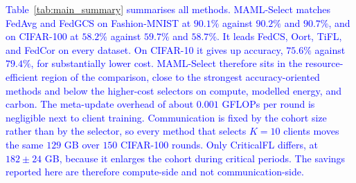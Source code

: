 \documentclass[journal]{IEEEtran}
\newcommand{\revision}[1]{\textcolor{blue}{#1}}
\begin{document}
\revision{Table~\ref{tab:main_summary} summarises all methods. MAML-Select matches FedAvg and FedGCS on Fashion-MNIST at $90.1\%$ against $90.2\%$ and $90.7\%$, and on CIFAR-100 at $58.2\%$ against $59.7\%$ and $58.7\%$. It leads FedCS, Oort, TiFL, and FedCor on every dataset. On CIFAR-10 it gives up accuracy, $75.6\%$ against $79.4\%$, for substantially lower cost. MAML-Select therefore sits in the resource-efficient region of the comparison, close to the strongest accuracy-oriented methods and below the higher-cost selectors on compute, modelled energy, and carbon. The meta-update overhead of about $0.001$ GFLOPs per round is negligible next to client training. Communication is fixed by the cohort size rather than by the selector, so every method that selects $K=10$ clients moves the same $129$ GB over $150$ CIFAR-100 rounds. Only CriticalFL differs, at $182 \pm 24$ GB, because it enlarges the cohort during critical periods. The savings reported here are therefore compute-side and not communication-side.}
\end{document}
